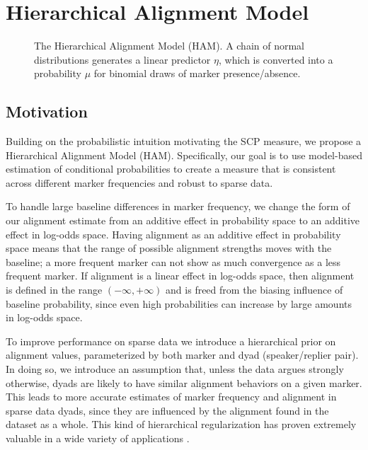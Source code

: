 \documentclass{acm_proc_article-sp}
\begin{document}
\section{Hierarchical Alignment Model}

\begin{figure}[t]
  \begin{center}
    
  \end{center}
  \caption{The Hierarchical Alignment Model (HAM). A chain of normal distributions generates a linear predictor $\eta$, which is converted into a probability $\mu$ for binomial draws of marker presence/absence.}\label{fig:model}
\end{figure}

\subsection{Motivation}

Building on the probabilistic intuition motivating the SCP measure, we propose a Hierarchical Alignment Model (HAM). Specifically, our goal is to use model-based estimation of conditional probabilities to create a measure that is consistent across different marker frequencies and robust to sparse data.  

To handle large baseline differences in marker frequency, we change the form of our alignment estimate from an additive effect in probability space to an additive effect in log-odds space. Having alignment as an additive effect in probability space means that the range of possible alignment strengths moves with the baseline; a more frequent marker can not show as much convergence as a less frequent marker. If alignment is a linear effect in log-odds space, then alignment is defined in the range $(-\infty,+\infty)$ and is freed from the biasing influence of baseline probability, since even high probabilities can increase by large amounts in log-odds space.

To improve performance on sparse data we introduce a hierarchical prior on alignment values, parameterized by both marker and dyad (speaker/replier pair). In doing so, we introduce an assumption that, unless the data argues strongly otherwise, dyads are likely to have similar alignment behaviors on a given marker. This leads to more accurate estimates of marker frequency and alignment in sparse data dyads, since they are influenced by the alignment found in the dataset as a whole. This kind of hierarchical regularization has proven extremely valuable in a wide variety of applications \cite{gelman2006}.  
\end{document}
